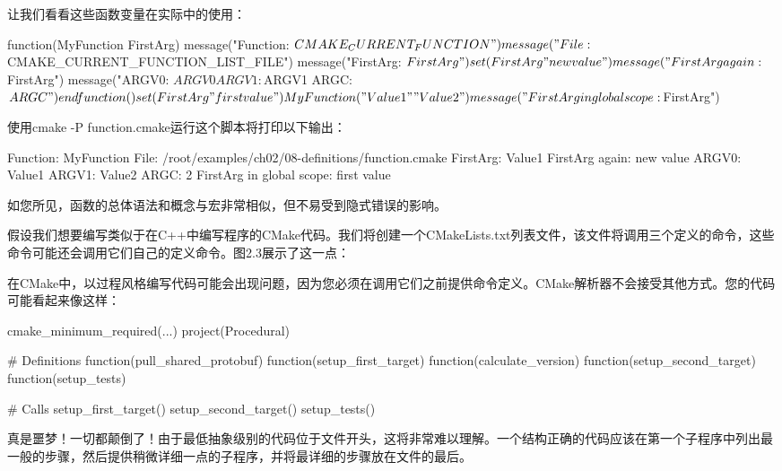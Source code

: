 让我们看看这些函数变量在实际中的使用：


\begin{cmake}
function(MyFunction FirstArg)
    message("Function: ${CMAKE_CURRENT_FUNCTION}")
    message("File: ${CMAKE_CURRENT_FUNCTION_LIST_FILE}")
    message("FirstArg: ${FirstArg}")
    set(FirstArg "new value")
    message("FirstArg again: ${FirstArg}")
    message("ARGV0: ${ARGV0} ARGV1: ${ARGV1} ARGC: ${ARGC}")
endfunction()
set(FirstArg "first value")
MyFunction("Value1" "Value2")
message("FirstArg in global scope: ${FirstArg}")
\end{cmake}

使用cmake -P function.cmake运行这个脚本将打印以下输出：

\begin{shell}
Function: MyFunction
File: /root/examples/ch02/08-definitions/function.cmake
FirstArg: Value1
FirstArg again: new value
ARGV0: Value1 ARGV1: Value2 ARGC: 2
FirstArg in global scope: first value
\end{shell}

如您所见，函数的总体语法和概念与宏非常相似，但不易受到隐式错误的影响。


假设我们想要编写类似于在C++中编写程序的CMake代码。我们将创建一个CMakeLists.txt列表文件，该文件将调用三个定义的命令，这些命令可能还会调用它们自己的定义命令。图2.3展示了这一点：


在CMake中，以过程风格编写代码可能会出现问题，因为您必须在调用它们之前提供命令定义。CMake解析器不会接受其他方式。您的代码可能看起来像这样：

\begin{cmake}
cmake_minimum_required(...)
project(Procedural)

# Definitions
function(pull_shared_protobuf)
function(setup_first_target)
function(calculate_version)
function(setup_second_target)
function(setup_tests)

# Calls
setup_first_target()
setup_second_target()
setup_tests()
\end{cmake}

真是噩梦！一切都颠倒了！由于最低抽象级别的代码位于文件开头，这将非常难以理解。一个结构正确的代码应该在第一个子程序中列出最一般的步骤，然后提供稍微详细一点的子程序，并将最详细的步骤放在文件的最后。

